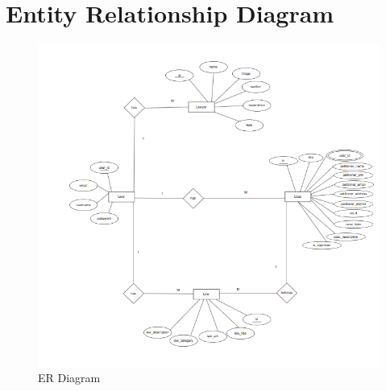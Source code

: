 \section{Entity Relationship Diagram}
\begin{figure}
  \centering
  \includegraphics[width=1\linewidth]{ERLAW.png}
 \caption{ER Diagram}
   \label{fig:ER-diagram}
\end{figure}
%
%
%
